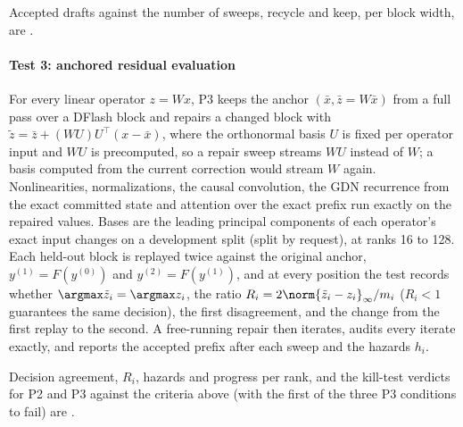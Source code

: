 Accepted drafts against the number of sweeps, recycle and keep, per block width, are .

\paragraph{Test 3: anchored residual evaluation}\label{sec:repair-residual}
For every linear operator $z=Wx$, P3 keeps the anchor $(\bar x,\bar z=W\bar x)$ from a full pass over a DFlash block and repairs a changed block with $\tilde z=\bar z+(WU)U^\top(x-\bar x)$, where the orthonormal basis $U$ is fixed per operator input and $WU$ is precomputed, so a repair sweep streams $WU$ instead of $W$; a basis computed from the current correction would stream $W$ again. Nonlinearities, normalizations, the causal convolution, the GDN recurrence from the exact committed state and attention over the exact prefix run exactly on the repaired values. Bases are the leading principal components of each operator's exact input changes on a development split (split by request), at ranks 16 to 128. Each held-out block is replayed twice against the original anchor, $y^{(1)}=F(y^{(0)})$ and $y^{(2)}=F(y^{(1)})$, and at every position the test records whether $\argmax\tilde z_i=\argmax z_i$, the ratio $R_i=2\norm{\tilde z_i-z_i}_\infty/m_i$ ($R_i<1$ guarantees the same decision), the first disagreement, and the change from the first replay to the second. A free-running repair then iterates, audits every iterate exactly, and reports the accepted prefix after each sweep and the hazards $h_i$.

Decision agreement, $R_i$, hazards and progress per rank, and the kill-test verdicts for P2 and P3 against the criteria above (with the first of the three P3 conditions to fail) are .\label{sec:repair-verdict}

